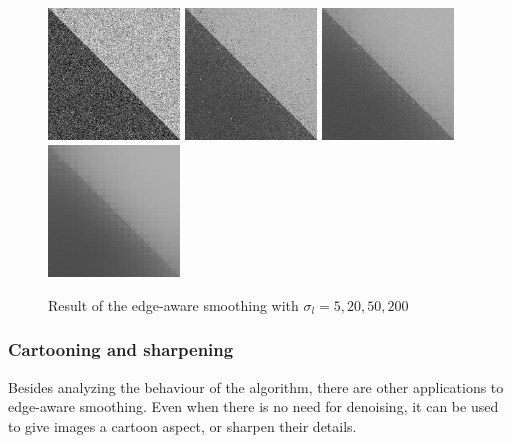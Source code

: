 \documentclass{article}
\begin{document}
\begin{figure}
    \centering
    \includegraphics[width=3.5cm]{pictures/BW/smoothing_diag_sigmal_100_10_5_new.png}
    \includegraphics[width=3.5cm]{pictures/BW/smoothing_diag_sigmal_100_10_20_new.png}
    \includegraphics[width=3.5cm]{pictures/BW/smoothing_diag_sigmal_100_10_50_new.png}
    \includegraphics[width=3.5cm]{pictures/BW/smoothing_diag_sigmal_100_10_200_new.png}
    \caption{Result of the edge-aware smoothing with $\sigma_{l} = 5, 20, 50, 200$}
    \label{fig:sigma_l}
\end{figure}

\subsubsection{Cartooning and sharpening}

Besides analyzing the behaviour of the algorithm, there are other applications to edge-aware smoothing. Even when there is no need for denoising, it can be used to give images a cartoon aspect, or sharpen their details.
\end{document}
